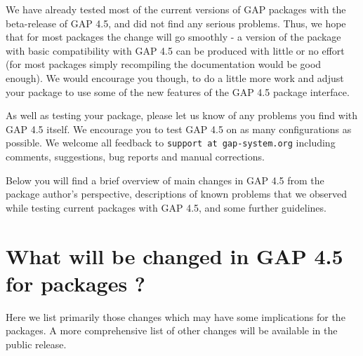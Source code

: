 \documentclass[10pt]{article}
\begin{document}

We have already tested most of the current versions of GAP packages with the
beta-release of GAP 4.5, and did not find any serious problems. Thus, we hope
that for most packages the change will go smoothly - a version of the
package with basic compatibility with GAP 4.5 can be produced with little or no
effort (for most packages simply recompiling the documentation would be good
enough). We would encourage you though, to do a little more work and adjust your package to use 
some of the new features of the GAP 4.5 package interface. 

As well as testing your package, please let us know of any problems you find 
with GAP 4.5 itself. We encourage you to test GAP 4.5 on as many configurations
as possible. We welcome all feedback to \verb|support at gap-system.org| 
including comments, suggestions, bug reports and manual corrections.

Below you will find a brief overview of main changes in GAP 4.5 from the
package author's perspective, descriptions of known problems that we observed while
testing current packages with GAP 4.5, and some further guidelines.


\section{What will be changed in GAP 4.5 for packages ?}

Here we list primarily those changes which may have some implications for the 
packages. A more comprehensive list of other changes will be available in the 
public release. 
\end{document}
